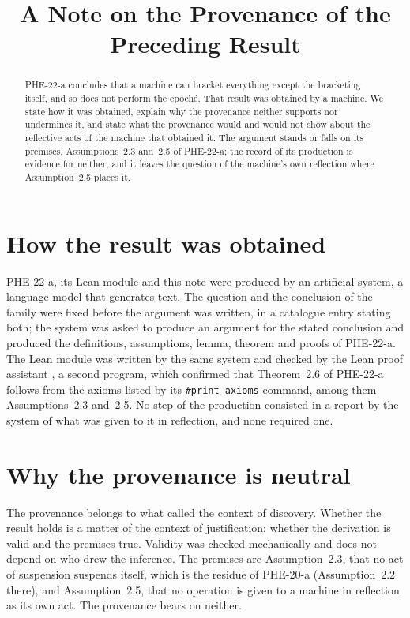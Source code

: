 \documentclass{situationist-preprint}
\title{A Note on the Provenance of the Preceding Result}
\begin{document}
\maketitle

\begin{abstract}
PHE-22-a concludes that a machine can bracket everything except the bracketing itself, and so does not perform the epoché. That result was obtained by a machine. We state how it was obtained, explain why the provenance neither supports nor undermines it, and state what the provenance would and would not show about the reflective acts of the machine that obtained it. The argument stands or falls on its premises, Assumptions~2.3 and~2.5 of PHE-22-a; the record of its production is evidence for neither, and it leaves the question of the machine's own reflection where Assumption~2.5 places it.
\end{abstract}

\section{How the result was obtained}

PHE-22-a, its Lean module and this note were produced by an artificial system, a language model that generates text. The question and the conclusion of the family were fixed before the argument was written, in a catalogue entry stating both; the system was asked to produce an argument for the stated conclusion and produced the definitions, assumptions, lemma, theorem and proofs of PHE-22-a. The Lean module was written by the same system and checked by the Lean proof assistant \citep{deMoura2021}, a second program, which confirmed that Theorem~2.6 of PHE-22-a follows from the axioms listed by its \texttt{\#print axioms} command, among them Assumptions~2.3 and~2.5. No step of the production consisted in a report by the system of what was given to it in reflection, and none required one.

\section{Why the provenance is neutral}

The provenance belongs to what \citet{Reichenbach1938} called the context of discovery. Whether the result holds is a matter of the context of justification: whether the derivation is valid and the premises true. Validity was checked mechanically and does not depend on who drew the inference. The premises are Assumption~2.3, that no act of suspension suspends itself, which is the residue of PHE-20-a (Assumption~2.2 there), and Assumption~2.5, that no operation is given to a machine in reflection as its own act. The provenance bears on neither.
\end{document}
